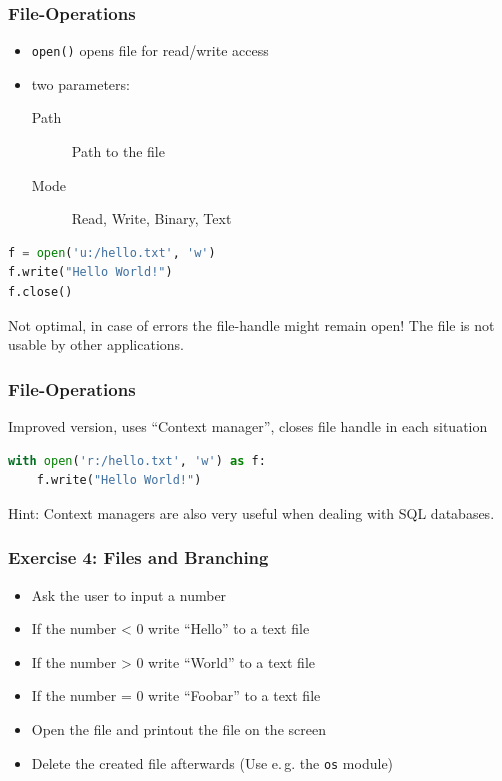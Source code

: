\documentclass[english]{beamer}
\begin{document}
\begin{frame}[containsverbatim]
\frametitle{File-Operations}

\begin{itemize}
\item \texttt{open()} opens file for read/write access
\item two parameters:

\begin{description}
\item[Path] Path to the file
\item[Mode] Read, Write, Binary, Text
\end{description}
\end{itemize}

\begin{lstlisting}[language=Python,caption={Simple example for \texttt{write()}}]
f = open('u:/hello.txt', 'w')
f.write("Hello World!")
f.close()
\end{lstlisting}

Not optimal, in case of errors the file-handle might remain open! The file is not usable by other applications.
\end{frame}


\begin{frame}[containsverbatim]
\frametitle{File-Operations}

Improved version, uses \enquote{Context manager}, closes file handle in each situation

\begin{lstlisting}[language=Python,caption={Improved example for \texttt{write()}}]
with open('r:/hello.txt', 'w') as f:
    f.write("Hello World!")
\end{lstlisting}

Hint: Context managers are also very useful when dealing with SQL databases.

\end{frame}

\begin{frame}
\frametitle{Exercise 4: Files and Branching}


\begin{itemize}
\item Ask the user to input a number
\item If the number < 0 write \enquote{Hello} to a text file
\item If the number > 0 write \enquote{World} to a text file
\item If the number = 0 write \enquote{Foobar} to a text file
\item Open the file and printout the file on the screen
\item Delete the created file afterwards (Use e.\,g. the \texttt{os} module)
\end{itemize}
\end{frame}
\end{document}
